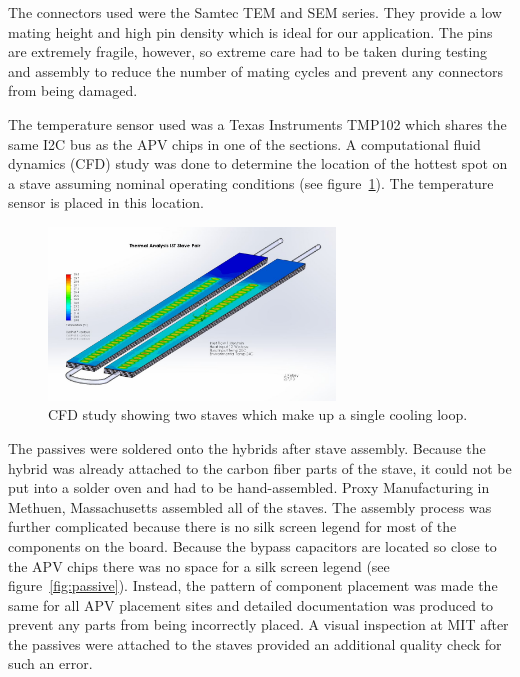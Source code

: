 \documentclass[1p,12pt]{elsarticle}
\begin{document}
The connectors used were the Samtec TEM and SEM series. They provide a low
mating height and high pin density which is ideal for our application. The
pins are extremely fragile, however, so extreme care had to be taken during
testing and assembly to reduce the number of mating cycles and prevent any
connectors from being damaged.

The temperature sensor used was a Texas Instruments TMP102 which shares the same
I2C bus as the APV chips in one of the sections. A computational fluid dynamics (CFD) study was done to
determine the location of the hottest spot on a stave assuming nominal operating
conditions (see figure~\ref{fig:cfd}). The temperature sensor is placed in this location.

\begin{figure}[ht]
\begin{center}
\includegraphics[width=3in, keepaspectratio=true, angle=0]{graphics/cfd.jpg}
\caption{CFD study showing two staves which make up a single cooling loop.
\label{fig:cfd}}
\end{center}
\end{figure}
%
The passives were soldered onto the hybrids after stave assembly. Because the
hybrid was already attached to the carbon fiber parts of the stave, it
could not be put into a solder oven and had to be hand-assembled. Proxy
Manufacturing in Methuen, Massachusetts assembled all of the staves. The
assembly process was further complicated because there is no silk screen
legend for most of the components on the board. Because the bypass capacitors
are located so close to the APV chips there was no space for a silk screen
legend (see figure~\ref{fig:passive}). Instead, the pattern of component placement was made the same for all
APV placement sites and detailed documentation was produced to prevent any parts
from being incorrectly placed. A visual inspection at MIT after the
passives were attached to the staves provided an additional quality check for
such an error.
\end{document}
